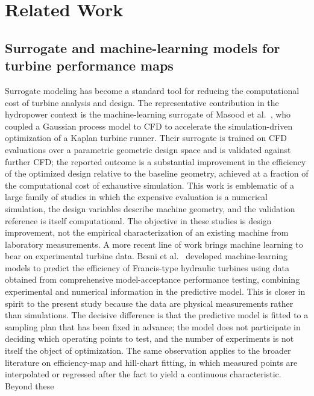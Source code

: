 \documentclass[preprint,12pt]{elsarticle}
\begin{document}
\section{Related Work}\label{sec:related}

\subsection{Surrogate and machine-learning models for turbine performance maps}
Surrogate modeling has become a standard tool for reducing the computational cost of
turbine analysis and design. The representative contribution in the hydropower
context is the machine-learning surrogate of Masood et al.~\cite{masood2021ml}, who
coupled a Gaussian process model to CFD to accelerate the simulation-driven
optimization of a Kaplan turbine runner. Their surrogate is trained on CFD
evaluations over a parametric geometric design space and is validated against
further CFD; the reported outcome is a substantial improvement in the efficiency of
the optimized design relative to the baseline geometry, achieved at a fraction of the
computational cost of exhaustive simulation. This work is emblematic of a large
family of studies in which the expensive evaluation is a numerical simulation, the
design variables describe machine geometry, and the validation reference is itself
computational. The objective in these studies is design improvement, not the
empirical characterization of an existing machine from laboratory measurements. A
more recent line of work brings machine learning to bear on experimental turbine
data. Besni et al.~\cite{besni2025ml} developed machine-learning models to predict
the efficiency of Francis-type hydraulic turbines using data obtained from
comprehensive model-acceptance performance testing, combining experimental and
numerical information in the predictive model. This is closer in spirit to the
present study because the data are physical measurements rather than simulations. The
decisive difference is that the predictive model is fitted to a sampling plan that
has been fixed in advance; the model does not participate in deciding which operating
points to test, and the number of experiments is not itself the object of
optimization. The same observation applies to the broader literature on
efficiency-map and hill-chart fitting, in which measured points are interpolated or
regressed after the fact to yield a continuous characteristic. Beyond these
\end{document}
